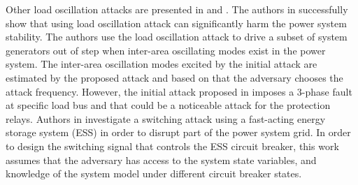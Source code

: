 \documentclass[journal]{IEEEtran}
\begin{document}
Other load oscillation attacks are presented in \cite{interarea} and  \cite{ESS}.
The authors in \cite{interarea} successfully show that using load oscillation attack can significantly harm the power system stability. The authors use the load oscillation attack to drive a subset of system generators out of step when inter-area oscillating modes exist in the power system. The inter-area oscillation modes excited by the initial attack are estimated by the proposed attack and based on that the adversary chooses the attack frequency.  However, the initial attack proposed in \cite{interarea} imposes a 3-phase fault at specific load bus and that could be a noticeable attack for the protection relays.
Authors in \cite{ESS} investigate a switching attack using a fast-acting energy storage system (ESS) in order to disrupt part of the power system grid. In order to design the switching signal that controls the ESS circuit breaker, this work assumes that the adversary has access to the system state variables, and knowledge of the system model under different circuit breaker states.  
\end{document}
